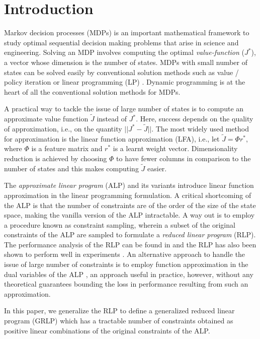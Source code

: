 \section{Introduction}
Markov decision processes (MDPs) is an important mathematical framework to study optimal sequential decision making problems that arise in science and engineering. Solving an MDP involves computing the optimal \emph{value-function} ($J^*$), a vector whose dimension is the number of states. MDPs with small number of states can be solved easily by conventional solution methods such as value / policy iteration or linear programming (LP) \cite{BertB}. Dynamic programming is at the heart of all the conventional solution methods for MDPs.\par
A practical way to tackle the issue of large number of states is to compute an approximate value function $\tilde{J}$ instead of $J^*$. Here, success depends on the quality of approximation, i.e., on the quantity $||J^*-\tilde{J}||$. The most widely used method for approximation is the linear function approximation (LFA), i.e., let $\tilde{J}=\Phi r^*$, where $\Phi$ is a feature matrix and $r^*$ is a learnt weight vector. Dimensionality reduction is achieved by choosing $\Phi$ to have fewer columns in comparison to the number of states and this makes computing $\tilde{J}$ easier.\par
The \emph{approximate linear program} (ALP) \cite{ALP,CS,SALP,ALP-Bor} and its variants introduce linear function approximation in the linear programming formulation. A critical shortcoming of the ALP is that the number of constraints are of the order of the size of the state space, making the vanilla version of the ALP intractable. A way out is to employ a procedure known as constraint sampling, wherein a subset of the original constraints of the ALP are sampled to formulate a \emph{reduced linear program} (RLP). The performance analysis of the RLP can be found in \cite{CS} and the RLP has also been shown to perform well in experiments \cite{ALP,CS,CST}. An alternative approach to handle the issue of large number of constraints is to employ function approximation in the dual variables of the ALP \cite{ALP-Bor,dolgov}, an approach useful in practice, however, without any theoretical guarantees bounding the loss in performance resulting from such an approximation.\par
In this paper, we generalize the RLP to define a generalized reduced linear program (GRLP) which has a tractable number of constraints obtained as positive linear combinations of the original constraints of the ALP. 

